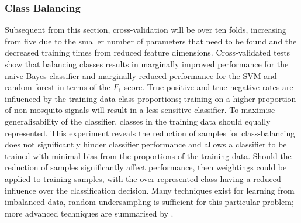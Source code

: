    

        \subsubsection{Class Balancing}
        \label{subsubsec:exp-clf-opt-class}
            Subsequent from this section, cross-validation will be over ten folds, increasing from five due to the smaller number of parameters that need to be found and the decreased training times from reduced feature dimensions. Cross-validated tests show that balancing classes results in marginally improved performance for the naive Bayes classifier and marginally reduced performance for the SVM and random forest in terms of the $F_{1}$ score. True positive and true negative rates are influenced by the training data class proportions; training on a higher proportion of non-mosquito signals will result in a less sensitive classifier. To maximise generalisability of the classifier, classes in the training data should equally represented. This experiment reveals the reduction of samples for class-balancing does not significantly hinder classifier performance and allows a classifier to be trained with minimal bias from the proportions of the training data. Should the reduction of samples significantly affect performance, then weightings could be applied to training samples, with the over-represented class having a reduced influence over the classification decision. Many techniques exist for learning from imbalanced data, random undersampling is sufficient for this particular problem; more advanced techniques are summarised by \textcite{He2009}.
                    
